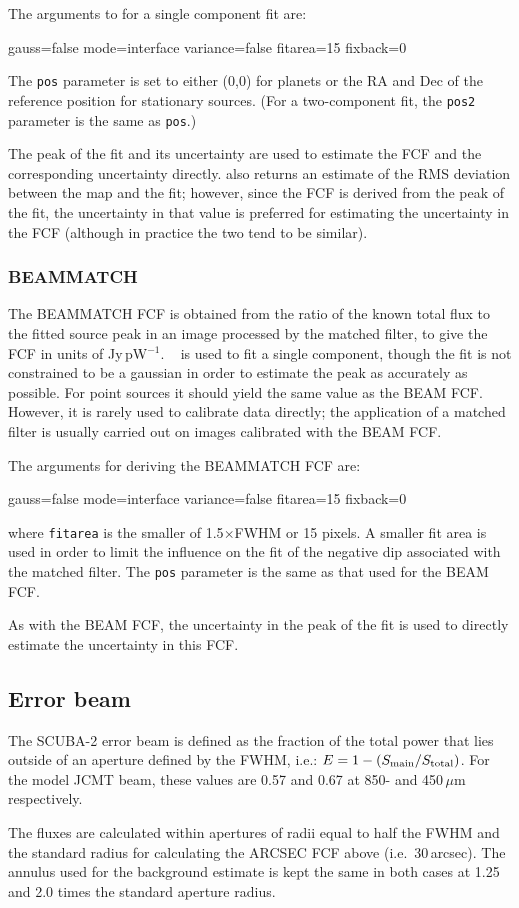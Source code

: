 The arguments to  for a single component fit are:
\begin{terminalv}
gauss=false mode=interface variance=false fitarea=15 fixback=0
\end{terminalv}
The \verb+pos+ parameter is set to either (0,0) for planets or the RA
and Dec of the reference position for stationary sources. (For a
two-component fit, the \verb+pos2+ parameter is the same as
\verb+pos+.)

The peak of the fit and its uncertainty are used to estimate the FCF
and the corresponding uncertainty directly.  also
returns an estimate of the RMS deviation between the map and the fit;
however, since the FCF is derived from the peak of the fit, the
uncertainty in that value is preferred for estimating the uncertainty
in the FCF (although in practice the two tend to be similar).

\subsubsection{BEAMMATCH}

The BEAMMATCH FCF is obtained from the ratio of the known total flux
to the fitted source peak in an image processed by the matched filter,
to give the FCF in units of Jy\,pW$^{-1}$. \KAPPA\  is
used to fit a single component, though the fit is not constrained to
be a gaussian in order to estimate the peak as accurately as
possible. For point sources it should yield the same value as the BEAM
FCF. However, it is rarely used to calibrate data directly; the
application of a matched filter is usually carried out on images
calibrated with the BEAM FCF.

The  arguments for deriving the BEAMMATCH FCF are:
\begin{terminalv}
gauss=false mode=interface variance=false fitarea=15 fixback=0
\end{terminalv}
where \verb+fitarea+ is the smaller of 1.5$\times$FWHM or 15 pixels. A
smaller fit area is used in order to limit the influence on the fit of
the negative dip associated with the matched filter. The \verb+pos+
parameter is the same as that used for the BEAM FCF.

As with the BEAM FCF, the uncertainty in the peak of the fit is used
to directly estimate the uncertainty in this FCF.

\subsection{Error beam}

The SCUBA-2 error beam is defined as the fraction of the total power
that lies outside of an aperture defined by the FWHM, i.e.: $E = 1 -
(S_{\rm main}/S_{\rm total})$. For the model JCMT beam, these values
are 0.57 and 0.67 at 850- and 450\,$\mu$m respectively.

The fluxes are calculated within apertures of radii equal to half the
FWHM and the standard radius for calculating the ARCSEC FCF above
(i.e.\ 30\,arcsec). The annulus used for the background estimate is
kept the same in both cases at 1.25 and 2.0 times the standard
aperture radius.

